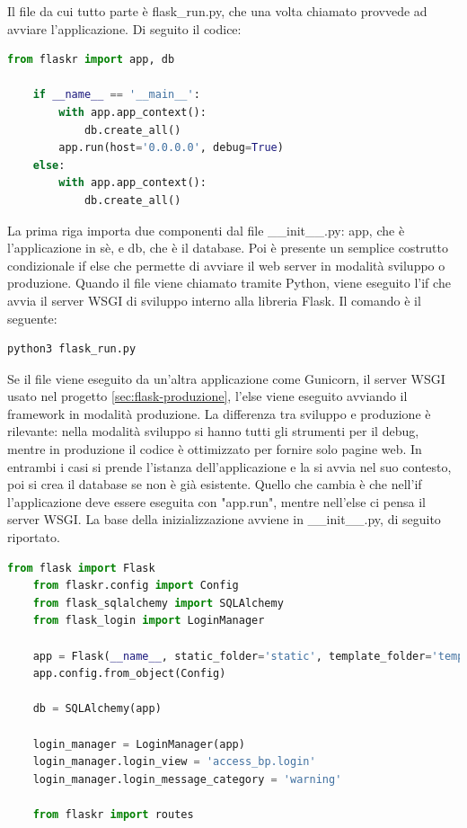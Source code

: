 Il file da cui tutto parte è flask\_run.py, che una volta chiamato provvede ad avviare l'applicazione. Di seguito il codice:
\begin{lstlisting}[language=python]
	from flaskr import app, db

	if __name__ == '__main__':
		with app.app_context():
			db.create_all()
		app.run(host='0.0.0.0', debug=True)
	else:   
		with app.app_context():
			db.create_all()
\end{lstlisting}
La prima riga importa due componenti dal file \_\_init\_\_.py: app, che è l'applicazione in sè, e db, che è il database.\newline
Poi è presente un semplice costrutto condizionale if else che permette di avviare il web server in modalità sviluppo o produzione.
Quando il file viene chiamato tramite Python, viene eseguito l'if che avvia il server WSGI di sviluppo interno alla libreria Flask.
\hypertarget{lst:flask-creazione-basi-run}
{Il comando è il seguente:}
\begin{lstlisting}[language=bash]
	python3 flask_run.py
\end{lstlisting}
Se il file viene eseguito da un'altra applicazione come Gunicorn, il server WSGI usato nel progetto \ref{sec:flask-produzione}, 
l'else viene eseguito avviando il framework in modalità produzione.
La differenza tra sviluppo e produzione è rilevante:
nella modalità sviluppo si hanno tutti gli strumenti per il debug,
mentre in produzione il codice è ottimizzato per fornire solo pagine web.
In entrambi i casi si prende l'istanza dell'applicazione e la si avvia nel suo contesto, poi si crea il database se non è già esistente.
Quello che cambia è che nell'if l'applicazione deve essere eseguita con "app.run", mentre nell'else ci pensa il server WSGI.\newline
\newline
\hypertarget{lst:flask-creazione-basi-init}
{La base della inizializzazione avviene in \_\_init\_\_.py, di seguito riportato.}
\begin{lstlisting}[language=python]
	from flask import Flask
	from flaskr.config import Config
	from flask_sqlalchemy import SQLAlchemy
	from flask_login import LoginManager
	
	app = Flask(__name__, static_folder='static', template_folder='templates')
	app.config.from_object(Config)
	
	db = SQLAlchemy(app)
	
	login_manager = LoginManager(app)
	login_manager.login_view = 'access_bp.login'
	login_manager.login_message_category = 'warning'
	
	from flaskr import routes
\end{lstlisting}
